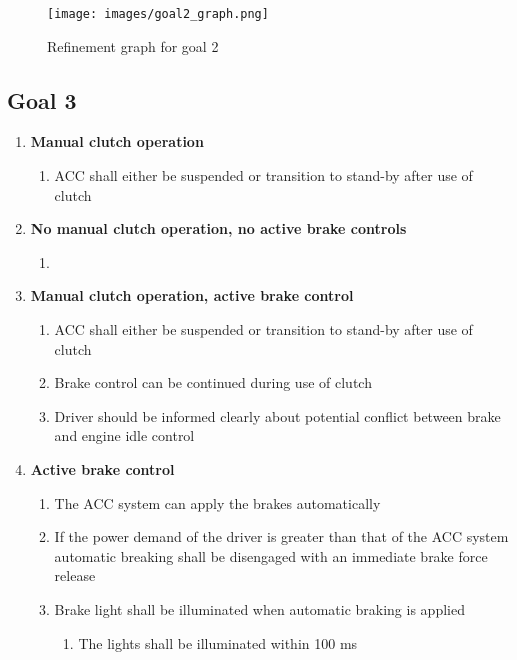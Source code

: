 \begin{figure}[H]
    \centering
    \texttt{[image: images/goal2\_graph.png]}
    \caption{Refinement graph for goal 2}
    \label{fig:graph_2}
\end{figure}



\subsection{Goal 3}

\begin{enumerate}
    \item{\bf Manual clutch operation}
    \begin{enumerate}[label*=\arabic*]
        \item{ACC shall either be suspended or transition to stand-by after use of clutch}
    \end{enumerate}
    \item{\bf No manual clutch operation, no active brake controls}
    \begin{enumerate}[label*=\arabic*]
        \item{}
    \end{enumerate}
    \item{\bf Manual clutch operation, active brake control}
    \begin{enumerate}[label*=\arabic*]
        \item{ACC shall either be suspended or transition to stand-by after use of clutch}
        \item{Brake control can be continued during use of clutch}
        \item{Driver should be informed clearly about potential conflict between brake and engine idle control}
    \end{enumerate}
    \item{\bf Active brake control}
    \begin{enumerate}[label*=\arabic*]
        \item {The ACC system can apply the brakes automatically}
        \item {If the power demand of the driver is greater than that of the ACC system automatic breaking shall be disengaged with an immediate brake force release}
        \item {Brake light shall be illuminated when automatic braking is applied}
        \begin{enumerate}[label*=\arabic*]
            \item {The lights shall be illuminated within 100 ms}

\end{enumerate}
\end{enumerate}
\end{enumerate}
